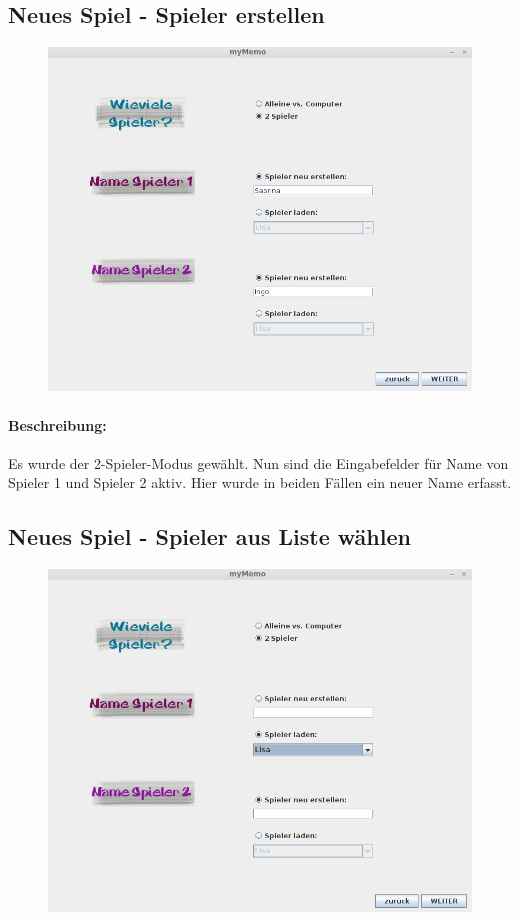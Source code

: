 \clearpage
\subsection{Neues Spiel - Spieler erstellen}
\begin{figure}[!h]
	\centering
    \includegraphics[width=\textwidth]{./guiSpielerNeu.png}
	\label{}
\end{figure}
\paragraph{Beschreibung: }Es wurde der 2-Spieler-Modus gewählt. Nun sind die Eingabefelder für Name von Spieler 1 und Spieler 2 aktiv. Hier wurde in beiden Fällen ein neuer Name erfasst.


\clearpage
\subsection{Neues Spiel - Spieler aus Liste wählen}
\begin{figure}[!h]
	\centering
    \includegraphics[width=\textwidth]{./guiSpielerListe.png}
	\label{}
\end{figure}

